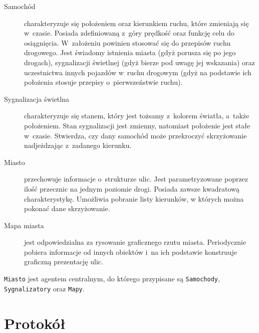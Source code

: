 \documentclass[11pt,a4paper]{article}
\begin{document}
\begin{description}
    \item[Samochód] charakteryzuje się położeniem oraz kierunkiem ruchu, które zmieniają się w~czasie. Posiada zdefiniowaną z~góry prędkość oraz funkcję celu do osiągnięcia. W~założeniu powinien stosować się do przepisów ruchu drogowego. Jest świadomy istnienia miasta (gdyż porusza się po jego drogach), sygnalizacji świetlnej (gdyż bierze pod uwagę jej wskazania) oraz uczestnictwa innych pojazdów w~ruchu drogowym (gdyż na podstawie ich położenia stosuje przepisy o~pierwszeństwie ruchu).
    \item[Sygnalizacja świetlna] charakteryzuje się stanem, który jest tożsamy z~kolorem światła, a~także położeniem. Stan sygnalizacji jest zmienny, natomiast położenie jest stałe w~czasie. Stwierdza, czy dany samochód może przekroczyć skrzyżowanie nadjeżdzając z~zadanego kierunku.
    \item[Miasto] przechowuje informacje o~strukturze ulic. Jest parametryzowane poprzez ilość przecznic na jednym poziomie drogi. Posiada zawsze kwadratową charakterystykę. Umożliwia pobranie listy kierunków, w których można pokonać dane skrzyżowanie.
    \item[Mapa miasta] jest odpowiedzialna za rysowanie graficznego rzutu miasta. Periodycznie pobiera informacje od innych obiektów i~na ich podstawie konstruuje graficzną prezentację ulic.
\end{description}

\verb+Miasto+ jest agentem centralnym, do którego przypisane są \verb+Samochody+, \verb+Sygnalizatory+ oraz \verb+Mapy+.

\section{Protokół}
\end{document}
